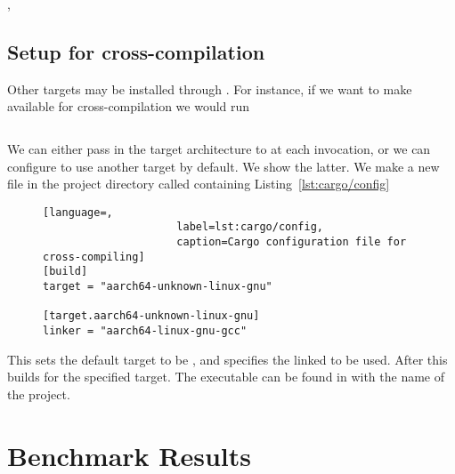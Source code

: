 \documentclass[b5paper]{report}
\begin{document}
\begin{appendices}
  \clearpage,
  \section{Setup for cross-compilation}
  Other targets may be installed through \rustup{}. For instance, if we want to
  make  available for cross-compilation we would run

  \begin{lstlisting}[language=Bash,numbers=none]
% rustup target add aarch64-unknown-linux-gnu
  \end{lstlisting}

  We can either pass in the target architecture to \cargo{} at each invocation,
  or we can configure \cargo{} to use another target by default. We show the latter.
  We make a new file in the project directory called 
  containing Listing~\ref{lst:cargo/config}

  \begin{figure}[ht]
  \begin{lstlisting}[language=,
                     label=lst:cargo/config,
                     caption=Cargo configuration file for cross-compiling]
[build]
target = "aarch64-unknown-linux-gnu"

[target.aarch64-unknown-linux-gnu]
linker = "aarch64-linux-gnu-gcc"
  \end{lstlisting}
  \end{figure}
  This sets the default target to be ,
  and specifies the linked to be used.
  After this  builds for the specified target.
  The executable can be found in 
  with the name of the project.


  \chapter{Benchmark Results}

\newcommand{\figuregrid}[1]{

  \rotatebox{90}{\hspace{-0.6cm}\footnotesize{\code{Queue::push}}}
  \foreach \scheme in {nothing, crossbeam, ebr, hp, hpspin} {%
    \begin{subfigure}{0.20\textwidth}
      \centering \footnotesize{\code{\scheme}}
      \texttt{[image: plots/\#1-s:\\scheme-b:queue\_push]}
    \end{subfigure}}

}
\end{appendices}
\end{document}
